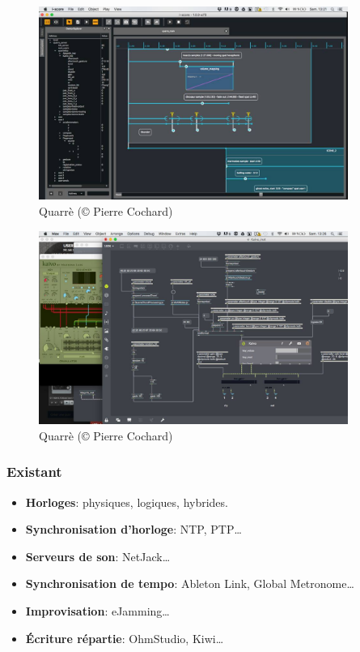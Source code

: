 \documentclass[handout]{beamer}
\begin{document}
\begin{frame}
\Large
\begin{figure}
	\centering
	\includegraphics[width=0.9\textwidth]{images/quarre-2.jpg}
	\caption{Quarrè (© Pierre Cochard)}
\end{figure}
\end{frame}

\begin{frame}
\Large
\begin{figure}
	\centering
	\includegraphics[width=0.9\textwidth]{images/quarre-3.jpg}
	\caption{Quarrè (© Pierre Cochard)}
\end{figure}
\end{frame}


\begin{frame}
    \frametitle{Existant}
    \Large
    \begin{itemize}
        \item \textbf{Horloges}: physiques, logiques, hybrides\cite{lamport1978time,kulkarni2014logical}.
        \item \textbf{Synchronisation d'horloge}: NTP, PTP\cite{mills1991internet,peng2009research}\dots
        \item \textbf{Serveurs de son}: NetJack\cite{carot2009netjack}\dots
        \item \textbf{Synchronisation de tempo}: Ableton Link, Global Metronome\cite{oda2016global}\dots
        \item \textbf{Improvisation}: eJamming\cite{mills2010dislocated}\dots
        \item \textbf{Écriture répartie}: OhmStudio, Kiwi\dots
    \end{itemize}
\end{frame}
\end{document}
